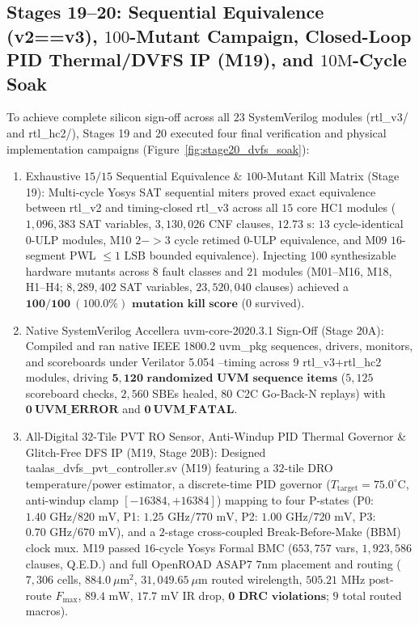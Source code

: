 \documentclass[10pt,journal,compsoc]{IEEEtran}
\def\texttt#1{#1}%
\def\textbf#1{#1}%
\def\to{->}%
\begin{document}
\subsection{Stages 19--20: Sequential Equivalence (\texttt{v2==v3}), $100$-Mutant Campaign, Closed-Loop PID Thermal/DVFS IP (\texttt{M19}), and $10\text{M}$-Cycle Soak}
To achieve complete silicon sign-off across all $23$ SystemVerilog modules (\texttt{rtl\_v3/} and \texttt{rtl\_hc2/}), Stages 19 and 20 executed four final verification and physical implementation campaigns (Figure~\ref{fig:stage20_dvfs_soak}):
\begin{enumerate}
    \item \textbf{Exhaustive $15/15$ Sequential Equivalence \& $100$-Mutant Kill Matrix (Stage 19)}: Multi-cycle Yosys SAT sequential miters proved exact equivalence between \texttt{rtl\_v2} and timing-closed \texttt{rtl\_v3} across all $15$ core HC1 modules ($1,096,383$ SAT variables, $3,130,026$ CNF clauses, $12.73\text{ s}$: $13$ cycle-identical $0\text{-ULP}$ modules, \texttt{M10} $2\to 3$ cycle retimed $0\text{-ULP}$ equivalence, and \texttt{M09} $16$-segment PWL $\le 1\text{ LSB}$ bounded equivalence). Injecting $100$ synthesizable hardware mutants across $8$ fault classes and $21$ modules (\texttt{M01}--\texttt{M16}, \texttt{M18}, \texttt{H1}--\texttt{H4}; $8,289,402$ SAT variables, $23,520,040$ clauses) achieved a $\mathbf{100/100\ (100.0\%)\text{ mutation kill score}}$ ($0$ survived).
    \item \textbf{Native SystemVerilog Accellera \texttt{uvm-core-2020.3.1} Sign-Off (Stage 20A)}: Compiled and ran native IEEE 1800.2 \texttt{uvm\_pkg} sequences, drivers, monitors, and scoreboards under \texttt{Verilator 5.054 --timing} across $9$ \texttt{rtl\_v3}+\texttt{rtl\_hc2} modules, driving $\mathbf{5,120\text{ randomized UVM sequence items}}$ ($5,125$ scoreboard checks, $2,560$ SBEs healed, $80$ C2C Go-Back-N replays) with $\mathbf{0\ \texttt{UVM\_ERROR}}$ and $\mathbf{0\ \texttt{UVM\_FATAL}}$.
    \item \textbf{All-Digital $32$-Tile PVT RO Sensor, Anti-Windup PID Thermal Governor \& Glitch-Free DFS IP (\texttt{M19}, Stage 20B)}: Designed \texttt{taalas\_dvfs\_pvt\_controller.sv} (\texttt{M19}) featuring a $32$-tile DRO temperature/power estimator, a discrete-time PID governor ($T_{\text{target}}=75.0^\circ\text{C}$, anti-windup clamp $[-16384,+16384]$) mapping to four P-states (\texttt{P0}: $1.40\text{ GHz}/820\text{ mV}$, \texttt{P1}: $1.25\text{ GHz}/770\text{ mV}$, \texttt{P2}: $1.00\text{ GHz}/720\text{ mV}$, \texttt{P3}: $0.70\text{ GHz}/670\text{ mV}$), and a $2$-stage cross-coupled Break-Before-Make (BBM) clock mux. \texttt{M19} passed $16$-cycle Yosys Formal BMC ($653,757$ vars, $1,923,586$ clauses, \texttt{Q.E.D.}) and full OpenROAD ASAP7 $7\text{nm}$ placement and routing ($7,306$ cells, $884.0\ \mu\text{m}^2$, $31,049.65\ \mu\text{m}$ routed wirelength, $505.21\text{ MHz}$ post-route $F_{\max}$, $89.4\text{ mW}$, $17.7\text{ mV}$ IR drop, $\mathbf{0\text{ DRC violations}}$; $9$ total routed macros).

\end{enumerate}
\end{document}
